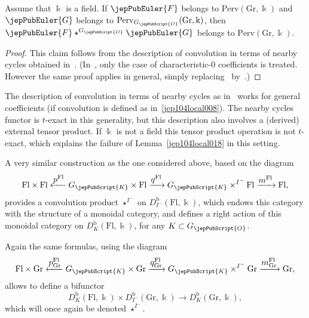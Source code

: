 \begin{lem}
\label{jep104local018}
 Assume that $\Bbbk$ is a field. If $\jepPubEuler{F}$ belongs to $\mathrm{Perv}(\mathrm{Gr},\Bbbk)$ and $\jepPubEuler{G}$ belongs to $\mathrm{Perv}_{G_{\jepPubScript{O}}}(\mathrm{Gr},\Bbbk)$, then $\jepPubEuler{F} \star^{G_{\jepPubScript{O}}} \jepPubEuler{G}$ belongs to $\mathrm{Perv}(\mathrm{Gr},\Bbbk)$.
\end{lem}

\begin{proof}
 This claim follows from the description of convolution in terms of nearby cycles obtained in~\cite[Prop.~6]{jep104ref27}. (In~\cite{jep104ref27}, only the case of characteristic-$0$ coefficients is treated. However the same proof applies in general, simply replacing~\cite[Prop.~1]{jep104ref27} by~\cite[Prop.~2.2]{jep104ref36}.)
\end{proof}

\begin{rmk}
The description of convolution in terms of nearby cycles as in~\cite{jep104ref27} works for general coefficients (if convolution is defined as in~\eqref{jep104local008}). The nearby cycles functor is $t$-exact in this generality, but this description also involves a (derived) external tensor product. If $\Bbbk$ is not a field this tensor product operation is not $t$-exact, which explains the failure of Lemma~\ref{jep104local018} in this setting.
\end{rmk}

A very similar construction as the one considered above, based on the diagram
\[
 \mathrm{Fl} \times \mathrm{Fl} \xleftarrow{\textstyle p^\mathrm{Fl}} G_{\jepPubScript{K}} \times \mathrm{Fl} \xrightarrow{\textstyle q^\mathrm{Fl}} G_{\jepPubScript{K}} \times^{I^-} \mathrm{Fl} \xrightarrow{\textstyle m^\mathrm{Fl}} \mathrm{Fl},
\]
provides a convolution product $\star^{I^-}$ on $D^{\mathrm{b}}_{I^-}(\mathrm{Fl},\Bbbk)$, which endows this category with the structure of a monoidal category, and defines a right action of this monoidal category on $D^{\mathrm{b}}_K(\mathrm{Fl},\Bbbk)$, for any $K \subset G_{\jepPubScript{O}}$.

Again the same formulas, using the diagram
\[
 \mathrm{Fl} \times \mathrm{Gr} \xleftarrow{\textstyle p^{\mathrm{Fl}}_{\mathrm{Gr}}} G_{\jepPubScript{K}} \times \mathrm{Gr} \xrightarrow{\textstyle q^{\mathrm{Fl}}_{\mathrm{Gr}}} G_{\jepPubScript{K}} \times^{I^-} \mathrm{Gr} \xrightarrow{\textstyle m^{\mathrm{Fl}}_{\mathrm{Gr}}} \mathrm{Gr},
\]
allows to define a bifunctor
\[
 D^{\mathrm{b}}_K(\mathrm{Fl},\Bbbk) \times D^{\mathrm{b}}_{I^-}(\mathrm{Gr},\Bbbk) \to D^{\mathrm{b}}_K(\mathrm{Gr},\Bbbk),
\]
which will once again be denoted $\star^{I^-}$.

